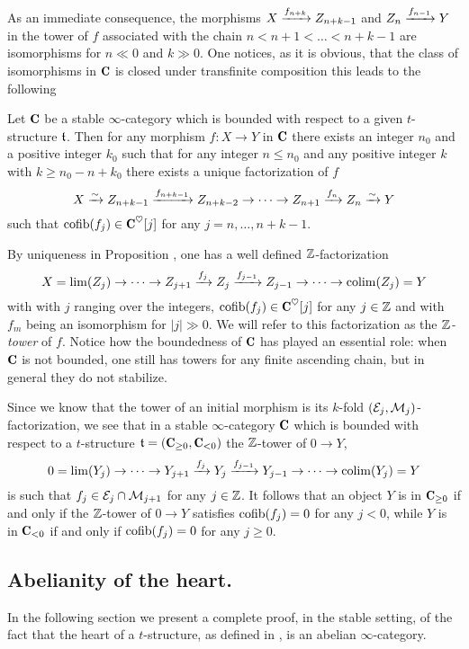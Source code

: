 \documentclass[a4paper,12pt]{amsart}
\renewcommand{\textbf}[1]{\text{\fontseries{b}\selectfont{\upshape #1}}}
\begin{document}
As an immediate consequence, the morphisms $X \xrightarrow{f_{n+k}} Z_{n+k-1}$ and $Z_{n} \xrightarrow{f_{n-1}} Y$ in the tower of $f$ associated with the chain $n<n+1<\dots<n+k-1$ are isomorphisms for $n\ll 0$ and $k \gg 0$. One notices, as it is obvious, that the class of isomorphisms in $\C$ is closed under transfinite composition this leads to the following
\begin{proposition}\label{prop.Z.Postnikov}
Let $\C$ be a stable $\infty$-category which is bounded with respect to a given $t$-structure $\mathfrak{t}$. 
Then for any morphism $f\colon X\to Y$  in $\C$ there exists an integer $n_0$ and a positive integer $k_0$ such that for any integer $n\leq n_0$ and any positive integer $k$ with $k\geq n_0-n+k_0$ there exists a unique factorization of $f$ 
\[
X \xrightarrow{\sim} Z_{n+k-1} \xrightarrow{f_{n+k-1}}Z_{n+k-2}\to\dots\to Z_{n+1} \xrightarrow{f_{n}} Z_{n} \xrightarrow{\sim} Y
\]
such that
$\cofib(f_j)\in \C^\heart[j]$ for any $j=n,\dots,n+k-1$.
\end{proposition}
\begin{remark}\label{oss.Z.Postnikov}
By uniqueness in Proposition , one has a well defined $\mathbb{Z} $-factorization
\[
X=\lim(Z_j) \to\cdots \to Z_{j+1} \xrightarrow{f_{j}} Z_{j} \xrightarrow{f_{j-1}}Z_{j-1}\to \cdots\to \mathrm{colim}(Z_j)=Y
\]
with 
with $j$ ranging over the integers, $\cofib(f_j)\in \C^\heart[j]$ for any $j\in \mathbb{Z} $ and with $f_m$ being an isomorphism for $|j|\gg 0$. We will refer to this factorization as the \emph{$\mathbb{Z} $-tower} of $f$. Notice how the boundedness of $\C$ has played an essential role: when $\C$ is not bounded, one still has towers for any finite ascending chain, but in general they do not stabilize.
\end{remark}
\begin{remark}\label{oss.for.Heart.to.t}
Since we know that the tower of an initial morphism is its $k$-fold $(\mathcal{E}_j,\mathcal{M}_j)$-factorization, we see that in a stable $\infty$-category $\C$ which is bounded with respect to a $t$-structure $\tee=(\C_{\geq 0},\C_{<0})$ the $\mathbb{Z} $-tower of $0\to Y$,
\[
0=\lim(Y_j) \to\cdots \to Y_{j+1} \xrightarrow{f_{j}} Y_{j} \xrightarrow{f_{j-1}}Y_{j-1}\to \cdots\to \mathrm{colim}(Y_j)=Y
\]
is such that $f_j\in \mathcal{E}_j\cap\mathcal{M}_{j+1}$ for any $j\in \mathbb{Z} $. It follows that an object $Y$ is in $\C_{\geq 0}$ if and only if the $\mathbb{Z} $-tower of $0\to Y$
satisfies $\operatorname{cofib}(f_j)=0$ for any $j< 0$, while $Y$ is in $\C_{<0}$ if and only if  $\operatorname{cofib}(f_j)=0$ for any $j\geq 0$.
\end{remark}
\subsection{Abelianity of the heart.}
In the following section we present a complete proof, in the stable setting, of the fact that the heart of a $t$-structure, as defined in \cite[Def. \textbf{1.2.1.11}]{LurieHA}, is an abelian $\infty$-category. 
\end{document}
